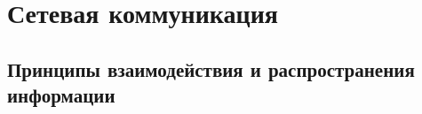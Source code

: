 \chapter{Сетевая коммуникация}\label{ch:ch3}

\section{Принципы взаимодействия и распространения информации}\label{sec:ch3/sect1}

%
%

